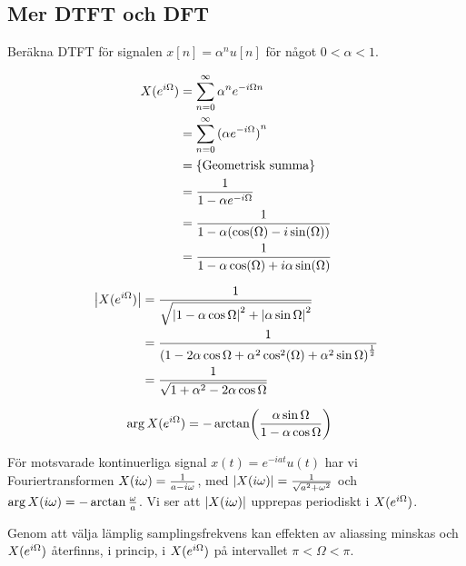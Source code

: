 \documentclass[a4paper]{article}
\begin{document}
\providecommand\fname{}
\renewcommand\fname{19-10-08}

\subsection{Mer DTFT och DFT}
\begin{ex}
    Beräkna DTFT för signalen \(
        x[n] = \alpha^n u[n]
    \) för något \(
        0 < \alpha < 1
    \).

    \begin{align*}
        X(e^{{i\Omega}}) &= \sum_{n=0}^\infty \alpha^n e^{-{i\Omega} n} \\
            &= \sum_{n=0}^\infty {(\alpha e^{-{i\Omega}})}^n \\
            &= \{ \text{Geometrisk summa} \} \\
            &= \frac{1}{ 1 - \alpha e^{-{i\Omega}} } \\
            &= \frac{1}{ 1 - \alpha ( \cos(\Omega) - i \sin(\Omega) ) } \\
            &= \frac{1}{ 1 - \alpha \cos(\Omega) + i \alpha \sin(\Omega) }
    \end{align*}

    \begin{align*}
        \abs{X(e^{{i\Omega}})} &= \frac{1}{ \sqrt{ \abs{1- \alpha \cos \Omega }^2 + \abs{\alpha \sin \Omega}^2 } } \\
            &= \frac{1}{ \left( 1-2\alpha \cos \Omega + \alpha^2 \cos^2(\Omega) + \alpha^2 \sin \Omega \right)^{\frac{1}{2}} } \\
            &= \frac{1}{ \sqrt{1 + \alpha^2 - 2 \alpha \cos \Omega} }
    \end{align*}

    \begin{align*}
        \arg{X(e^{{i\Omega}})} &= - \arctan( \frac{\alpha \sin \Omega}{1 - \alpha \cos \Omega} )
    \end{align*}
\end{ex}

För motsvarade kontinuerliga signal \(
    x(t) = e^{-iat}u(t)
\) har vi Fouriertransformen \(
    X({i\omega}) = \frac{1}{a-{i\omega}}
\), med \(
    \abs{X({i\omega})} = \frac{1}{\sqrt{a^2+\omega^2}}
\) och \(
    \arg{X({i\omega})} = - \arctan{\frac{\omega}{a}}
\). Vi ser att \(
    \abs{X({i\omega})} \) upprepas periodiskt i \(
        X(e^{{i\Omega}})
\).

Genom att välja lämplig samplingsfrekvens kan effekten av aliassing minskas 
och \(
    X(e^{i\Omega})
\) återfinns, i princip, i \(
    X(e^{i\Omega})
\) på intervallet \(
    \pi < \Omega < \pi
\).
\end{document}
